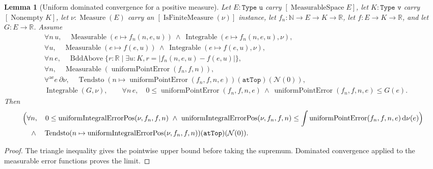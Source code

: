 \documentclass[9pt]{extarticle}
\newtheorem{lemma}{Lemma}[section]
\theoremstyle{definition}
\theoremstyle{remark}
\newcommand{\R}{\mathbb R}
\newcommand{\N}{\mathbb N}
\newcommand{\dd}{\,\mathrm d}
\newcommand{\abs}[1]{\left\lvert #1\right\rvert}
\begin{document}
\begin{lemma}[Uniform dominated convergence for a positive measure]
\label{lem:fnd-uniform-dct}
Let $E:\texttt{Type u}$ carry $[\operatorname{MeasurableSpace}E]$, let
$K:\texttt{Type v}$ carry $[\operatorname{Nonempty}K]$, let
$\nu:\operatorname{Measure}(E)$ carry an
$[\operatorname{IsFiniteMeasure}(\nu)]$ instance, let
$f_n:\N\to E\to K\to\R$, let $f:E\to K\to\R$, and let $G:E\to\R$.
Assume
\begin{align*}
 &\forall n\,u,\quad
   \operatorname{Measurable}(e\mapsto f_n(n,e,u))\ \wedge\
   \operatorname{Integrable}(e\mapsto f_n(n,e,u),\nu),\\
 &\forall u,\quad
   \operatorname{Measurable}(e\mapsto f(e,u))\ \wedge\
   \operatorname{Integrable}(e\mapsto f(e,u),\nu),\\
 &\forall n\,e,\quad
   \operatorname{BddAbove}
    \{r:\R\mid\exists u:K,r=\abs{f_n(n,e,u)-f(e,u)}\},\\
 &\forall n,\quad
   \operatorname{Measurable}(\operatorname{uniformPointError}(f_n,f,n)),\\
 &\forall^{\mathrm{ae}}e\ \partial\nu,\quad
   \operatorname{Tendsto}
    (n\mapsto\operatorname{uniformPointError}(f_n,f,n,e))
    (\texttt{atTop})(\mathcal N(0)),\\
 &\operatorname{Integrable}(G,\nu),\qquad
   \forall n\,e,\quad
   0\leq\operatorname{uniformPointError}(f_n,f,n,e)\ \wedge\
   \operatorname{uniformPointError}(f_n,f,n,e)\leq G(e).
\end{align*}
Then
\begin{align*}
 &\Bigl(\forall n,\quad
  0\leq\operatorname{uniformIntegralErrorPos}(\nu,f_n,f,n)\ \wedge\
  \operatorname{uniformIntegralErrorPos}(\nu,f_n,f,n)
   \leq\int\operatorname{uniformPointError}(f_n,f,n,e)\dd\nu(e)\Bigr)\\
 &\quad\wedge\quad\operatorname{Tendsto}
   (n\mapsto\operatorname{uniformIntegralErrorPos}(\nu,f_n,f,n))
   (\texttt{atTop})(\mathcal N(0)).
\end{align*}
\end{lemma}

\begin{proof}
The triangle inequality gives the pointwise upper bound before taking the
supremum.  Dominated convergence applied to the measurable error functions
proves the limit.
\end{proof}
\end{document}
